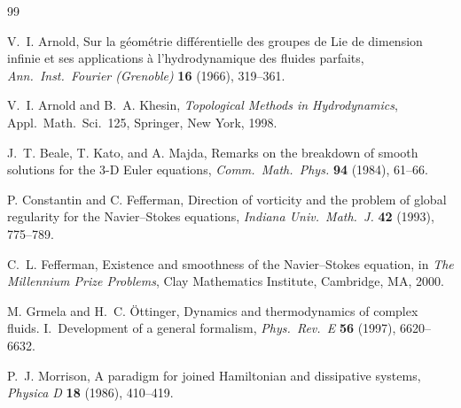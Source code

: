 \documentclass[11pt,reqno]{amsart}
\theoremstyle{plain}
\theoremstyle{definition}
\theoremstyle{remark}
\begin{document}
\begin{thebibliography}{99}

V.~I. Arnold,
\newblock Sur la g\'{e}om\'{e}trie diff\'{e}rentielle des groupes de Lie de
  dimension infinie et ses applications \`{a} l'hydrodynamique des fluides
  parfaits,
\newblock \emph{Ann.\ Inst.\ Fourier (Grenoble)} \textbf{16} (1966), 319--361.

V.~I. Arnold and B.~A. Khesin,
\newblock \emph{Topological Methods in Hydrodynamics},
\newblock Appl.\ Math.\ Sci.\ 125, Springer, New York, 1998.

J.~T. Beale, T. Kato, and A. Majda,
\newblock Remarks on the breakdown of smooth solutions for the 3-D Euler
  equations,
\newblock \emph{Comm.\ Math.\ Phys.} \textbf{94} (1984), 61--66.

P. Constantin and C. Fefferman,
\newblock Direction of vorticity and the problem of global regularity for the
  Navier--Stokes equations,
\newblock \emph{Indiana Univ.\ Math.\ J.} \textbf{42} (1993), 775--789.

C.~L. Fefferman,
\newblock Existence and smoothness of the Navier--Stokes equation,
\newblock in \emph{The Millennium Prize Problems}, Clay Mathematics Institute,
  Cambridge, MA, 2000.

M. Grmela and H.~C. \"{O}ttinger,
\newblock Dynamics and thermodynamics of complex fluids. I.~Development of a
  general formalism,
\newblock \emph{Phys.\ Rev.\ E} \textbf{56} (1997), 6620--6632.

P.~J. Morrison,
\newblock A paradigm for joined Hamiltonian and dissipative systems,
\newblock \emph{Physica D} \textbf{18} (1986), 410--419.

\end{thebibliography}
\end{document}

